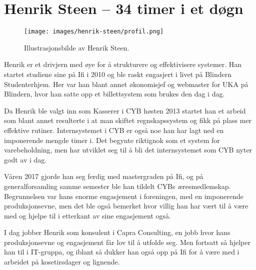 \chapter[Henrik Steen]{Henrik Steen -- 34 timer i et døgn}

\author{Skrevet av Arne Hassel}

\begin{wrapfigure}{l}{7cm}
	\vspace{-60pt}
	\centering
	\texttt{[image: images/henrik-steen/profil.png]}
	\label{fig:morten-daehlen}
	\caption{Illustrasjonsbilde av Henrik Steen.}
\end{wrapfigure}

Henrik er et drivjern med øye for å strukturere og effektivisere systemer. Han startet studiene sine på Ifi i 2010 og ble raskt engasjert i livet på Blindern Studenterhjem. Her var han blant annet økonomisjef og webmaster for UKA på Blindern, hvor han satte opp et billettsystem som brukes den dag i dag.

Da Henrik ble valgt inn som Kasserer i CYB høsten 2013 startet han et arbeid som blant annet resulterte i at man skiftet regnskapssystem og fikk på plass mer effektive rutiner. Internsystemet i CYB er også noe han har lagt ned en imponerende mengde timer i. Det begynte riktignok som et system for varebeholdning, men har utviklet seg til å bli det internsystemet som CYB nyter godt av i dag.

Våren 2017 gjorde han seg ferdig med mastergraden på Ifi, og på generalforsamling samme semester ble han tildelt CYBs æresmedlemskap. Begrunnelsen var hans enorme engasjement i foreningen, med en imponerende produksjonsevne, men det ble også bemerket hvor villig han har vært til å være med og hjelpe til i etterkant av sine engasjement også.

I dag jobber Henrik som konsulent i Capra Consulting, en jobb hvor hans produksjonsevne og engasjement får lov til å utfolde seg. Men fortsatt så hjelper han til i IT-gruppa, og iblant så dukker han også opp på Ifi for å være med i arbeidet på kosetirsdager og lignende.
